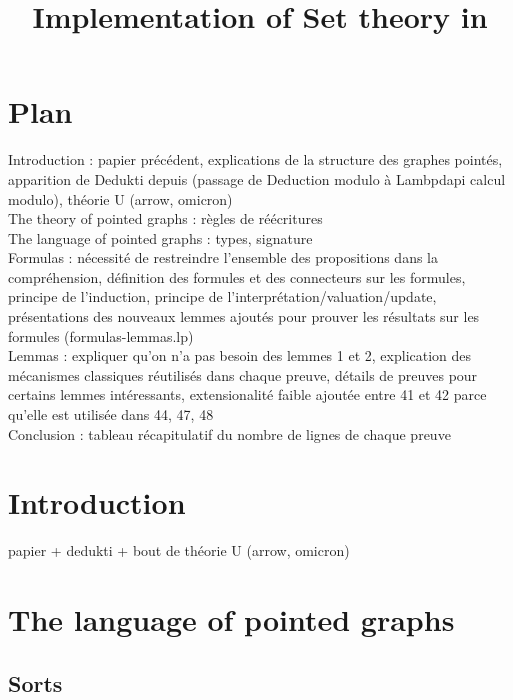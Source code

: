 \documentclass[a4paper]{article}
\title{Implementation of Set theory in \dedukti}
\date{}
\begin{document}
\thispagestyle{empty}
\maketitle


\section*{Plan}

Introduction : papier précédent, explications de la structure des graphes pointés, apparition de Dedukti depuis (passage de Deduction modulo à Lambpdapi calcul modulo), théorie U (arrow, omicron) \\

The theory of pointed graphs : règles de réécritures \\

The language of pointed graphs : types, signature \\

Formulas : nécessité de restreindre l'ensemble des propositions dans la compréhension, définition des formules et des connecteurs sur les formules, principe de l'induction, principe de l'interprétation/valuation/update, présentations des nouveaux lemmes ajoutés pour prouver les résultats sur les formules (formulas-lemmas.lp) \\

Lemmas : expliquer qu'on n'a pas besoin des lemmes 1 et 2, explication des mécanismes classiques réutilisés dans chaque preuve, détails de preuves pour certains lemmes intéressants, extensionalité faible ajoutée entre 41 et 42 parce qu'elle est utilisée dans 44, 47, 48 \\

Conclusion : tableau récapitulatif du nombre de lignes de chaque preuve

\section{Introduction}

papier + dedukti + bout de théorie U (arrow, omicron)

\section{The language of pointed graphs}

\subsection{Sorts}
\end{document}
